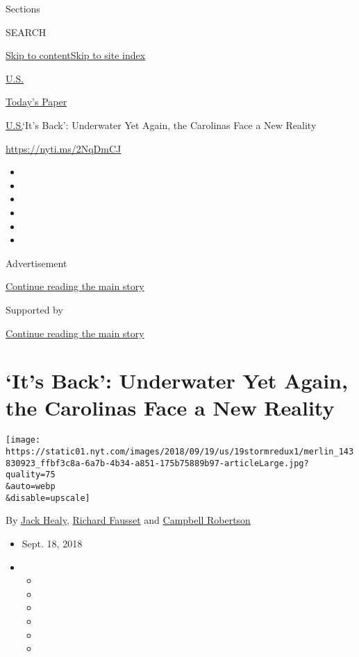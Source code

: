 Sections

SEARCH

\protect\hyperlink{site-content}{Skip to
content}\protect\hyperlink{site-index}{Skip to site index}

\href{https://www.nytimes.com/section/us}{U.S.}

\href{https://myaccount.nytimes.com/auth/login?response_type=cookie\&client_id=vi}{}

\href{https://www.nytimes.com/section/todayspaper}{Today's Paper}

\href{/section/us}{U.S.}\textbar{}`It's Back': Underwater Yet Again, the
Carolinas Face a New Reality

\url{https://nyti.ms/2NqDmCJ}

\begin{itemize}
\item
\item
\item
\item
\item
\item
\end{itemize}

Advertisement

\protect\hyperlink{after-top}{Continue reading the main story}

Supported by

\protect\hyperlink{after-sponsor}{Continue reading the main story}

\hypertarget{its-back-underwater-yet-again-the-carolinas-face-a-new-reality}{%
\section{`It's Back': Underwater Yet Again, the Carolinas Face a New
Reality}\label{its-back-underwater-yet-again-the-carolinas-face-a-new-reality}}

\texttt{[image: https://static01.nyt.com/images/2018/09/19/us/19stormredux1/merlin\_143830923\_ffbf3c8a-6a7b-4b34-a851-175b75889b97-articleLarge.jpg?quality=75\\\&auto=webp\\\&disable=upscale]}

By \href{http://www.nytimes.com/by/jack-healy}{Jack Healy},
\href{https://www.nytimes.com/by/richard-fausset}{Richard Fausset} and
\href{http://www.nytimes.com/by/campbell-robertson}{Campbell Robertson}

\begin{itemize}
\item
  Sept. 18, 2018
\item
  \begin{itemize}
  \item
  \item
  \item
  \item
  \item
  \item
  \end{itemize}
\end{itemize}

